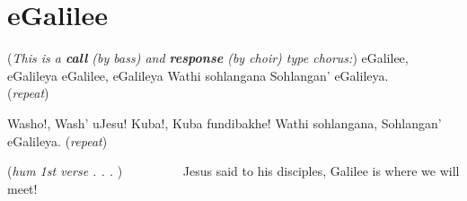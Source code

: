 \starttocol
\chapter{eGalilee}
\nexttocol
\hfill{\it }
\stoptocol
({\it This is a {\bf call} (by bass) and {\bf response} (by choir) type chorus:})
\starttocol
\startlines
eG{\sc alilee}, eGalileya
eGalilee, eGalileya
Wathi sohlangana
Sohlangan' eGalileya.   \hfill({\it repeat})~~~~~~~~~

Washo!, Wash' uJesu!
Kuba!, Kuba fundibakhe!
Wathi sohlangana,  Sohlangan' eGalileya.
  \hfill({\it repeat})~~~~~~~~~

          \hfill({\it hum 1st verse . . . })~~~~~~~~~
\stoplines
\nexttocol
Jesus said to his disciples,
Galilee is where we will meet!
\stoptocol
